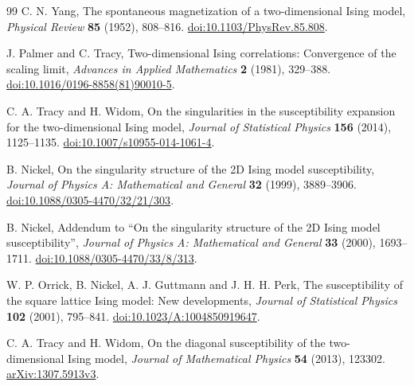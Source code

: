 \documentclass[11pt]{article}
\numberwithin{equation}{section}
\theoremstyle{remark}\newtheorem{remark}[theorem]{Remark}
\begin{document}
\begin{thebibliography}{99}
C. N. Yang, The spontaneous magnetization of a two-dimensional
Ising model, \emph{Physical Review} \textbf{85} (1952), 808--816.
\href{https://doi.org/10.1103/PhysRev.85.808}{doi:10.1103/PhysRev.85.808}.

J. Palmer and C. Tracy, Two-dimensional Ising correlations:
Convergence of the scaling limit, \emph{Advances in Applied
Mathematics} \textbf{2} (1981), 329--388.
\href{https://doi.org/10.1016/0196-8858(81)90010-5}{doi:10.1016/0196-8858(81)90010-5}.

C. A. Tracy and H. Widom, On the singularities in the susceptibility
expansion for the two-dimensional Ising model,
\emph{Journal of Statistical Physics} \textbf{156} (2014), 1125--1135.
\href{https://doi.org/10.1007/s10955-014-1061-4}{doi:10.1007/s10955-014-1061-4}.


B. Nickel, On the singularity structure of the 2D Ising model susceptibility,
\emph{Journal of Physics A: Mathematical and General} \textbf{32} (1999), 3889--3906.
\href{https://doi.org/10.1088/0305-4470/32/21/303}{doi:10.1088/0305-4470/32/21/303}.

B. Nickel, Addendum to ``On the singularity structure of the 2D Ising model susceptibility'',
\emph{Journal of Physics A: Mathematical and General} \textbf{33} (2000), 1693--1711.
\href{https://doi.org/10.1088/0305-4470/33/8/313}{doi:10.1088/0305-4470/33/8/313}.

W. P. Orrick, B. Nickel, A. J. Guttmann and J. H. H. Perk,
The susceptibility of the square lattice Ising model: New developments,
\emph{Journal of Statistical Physics} \textbf{102} (2001), 795--841.
\href{https://doi.org/10.1023/A:1004850919647}{doi:10.1023/A:1004850919647}.

C. A. Tracy and H. Widom, On the diagonal susceptibility of the two-dimensional
Ising model, \emph{Journal of Mathematical Physics} \textbf{54} (2013), 123302.
\href{https://arxiv.org/abs/1307.5913v3}{arXiv:1307.5913v3}.

\end{thebibliography}
\end{document}
